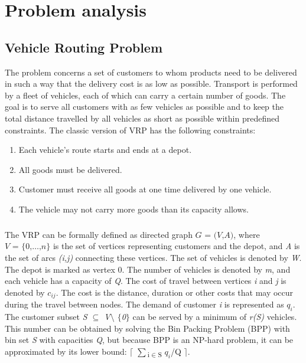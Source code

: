 \documentclass[a4paper,twoside,12pt]{book}
\begin{document}
\chapter{Problem analysis}

\section{Vehicle Routing Problem}
The problem concerns a set of customers to whom products need to be delivered in such a way that the delivery cost is as low as possible. Transport is performed by a fleet of vehicles, each of which can carry a certain number of goods. The goal is to serve all customers with as few vehicles as possible and to keep the total distance travelled by all vehicles as short as possible within predefined constraints. The classic version of VRP has the following constraints: 
\begin{enumerate}
	\item Each vehicle's route starts and ends at a depot.
	\item All goods must be delivered.
	\item Customer must receive all goods at one time delivered by one vehicle.
	\item The vehicle may not carry more goods than its capacity allows.	
\end{enumerate}
\paragraph{}
The VRP can be formally defined as directed graph $\textit{G = (V,A)}$, where $\textit{V = $\lbrace$0,\ldots,n$\rbrace$}$ is the set of vertices representing customers and the depot, and \textit{A} is the set of arcs \textit{(i,j)} connecting these vertices. The set of vehicles is denoted by \textit{W}. The depot is marked as vertex 0. The number of vehicles is denoted by \textit{m}, and each vehicle has a capacity of \textit{Q}. The cost of travel between vertices \textit{i} and \textit{j} is denoted by \textit{$c_{ij}$}. The cost is the distance, duration or other costs that may occur during the travel between nodes. The demand of customer \textit{i} is represented as \textit{$q_{i}$}.
The customer subset \textit{S $\subseteq$ V$\setminus$ $\lbrace$0$\rbrace$} can be served by a minimum of \textit{r(S)} vehicles. This number can be obtained by solving the Bin Packing Problem (BPP) with bin set \textit{S} with capacities \textit{Q}, but because BPP is an NP-hard problem, it can be approximated by its lower bound: $\lceil$ $\sum$\textsubscript{i$\in$S} $q_{i}$/Q $\rceil$.\cite{bib:article:CordeauVehicleRouting}
\end{document}
